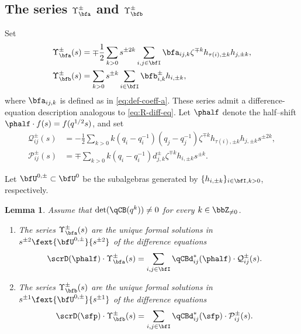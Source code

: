 \documentclass[reqno]{amsart}
\numberwithin{equation}{section}
\newtheorem*{lemma}{Lemma}
\begin{document}
\subsection{The series $\Upsilon_{\bfa}^\pm$ and $\Upsilon_{\bfb}^\pm$}\label{ss:Upsilon-a-b}
Set
\begin{align}
\Upsilon_{\bfa}^\pm(s)
&=
\mp\frac{1}{2}
\sum_{k>0}s^{\pm2k}
\sum_{i,j\in\bfI}
\bfa_{ij,k}\zeta^{\mp k}
h_{\tau(i),\pm k}h_{j,\pm k},
\label{eq:bK0-Upsilon-a}\\
\Upsilon_{\bfb}^\pm(s)
&=
\sum_{k>0}s^{\pm k}
\sum_{i\in\bfI}\bfb_{i,k}^{\pm}h_{i,\pm k}
\label{eq:bK0-Upsilon-b},
\end{align}
where $\bfa_{ij,k}$ is defined as in \eqref{eq:def-coeff-a}.
These series admit a difference-equation description analogous to
\eqref{eq:R-diff-eq}. Let $\phalf$ denote the
half--shift $\phalf\cdot f(s)=f(q^{1/2}s)$, and set
\begin{align}
\mathcal Q_{ij}^{\pm}(s)
&=
-\frac{1}{2}\sum_{k>0}
k(q_i-q_i^{-1})(q_j-q_j^{-1})
\zeta^{\mp k}
h_{\tau(i),\pm k}h_{j,\pm k}s^{\pm2 k},
\label{eq:bK0-source-Q}\\
\mathcal P_{ij}^{\pm}(s)
&=
\mp\sum_{k>0}
k(q_i-q_i^{-1})d_{j,k}^{\pm}
\zeta^{\mp k}h_{i,\pm k}s^{\pm k}.
\label{eq:bK0-source-P}
\end{align}

Let $\bfU^{0,\pm} \subset \bfU^0$ be the subalgebras generated by $\{h_{i,\pm k}\}_{i\in\bfI,k>0}$, respectively.

\begin{lemma}\label{prop:bK0-difference-equation}
Assume that $\det(\qCB(q^k))\neq0$ for every
$k\in\bbZ_{\neq0}$.
\begin{enumerate}[leftmargin=2em]\itemsep0.25cm
	\item 
	The series $\Upsilon_{\bfa}^\pm(s)$ are the unique formal solutions in ${s^{\pm2}}\fext{\bfU^{0,\pm}}{s^{\pm2}}$ of the difference equations
	\begin{equation}\label{eq:bK0-form-diff-eq-a}
		\begin{aligned}
			\scrD(\phalf)\cdot\Upsilon_{\bfa}^{\pm}(s)
			&=
			\sum_{i,j\in\bfI}
			\qCBd^*_{ij}(\phalf)\cdot
			\mathcal Q_{ij}^{\pm}(s).
		\end{aligned}
	\end{equation}
	\item 
	The series $\Upsilon_{\bfb}^\pm(s)$ are the unique formal solutions in ${s^{\pm1}}\fext{\bfU^{0,\pm}}{s^{\pm1}}$ of the difference equations
	\begin{equation}\label{eq:bK0-form-diff-eq-b}
		\begin{aligned}
			\scrD(\sfp)\cdot\Upsilon_{\bfb}^{\pm}(s)
			&=
			\sum_{i,j\in\bfI}
			\qCBd^*_{ij}(\sfp)\cdot
			\mathcal P_{ij}^{\pm}(s).
		\end{aligned}
	\end{equation}
\end{enumerate}
\end{lemma}
\end{document}

